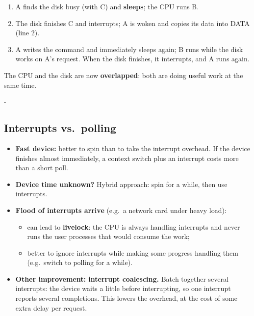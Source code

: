 \documentclass[11pt,a4paper]{article}
\makeatletter
\newcommand{\keepspace}[1]{\par\penalty-100\begingroup
  \setlength{\dimen@}{#1}\dimen@ii\pagegoal\advance\dimen@ii-\pagetotal
  \ifdim\dimen@>\dimen@ii\ifdim\dimen@ii>\z@\vfil\fi\break\fi\endgroup}
\makeatother
\begin{document}
\begin{enumerate}[label=\textbf{\arabic*.}]
  \item A finds the disk busy (with C) and \textbf{sleeps}; the CPU runs B.
  \item The disk finishes C and interrupts; A is woken and copies its data
        into DATA (line 2).
  \item[\textbf{3,4.}] A writes the command and immediately sleeps again; B runs
        while the disk works on A's request. When the disk finishes, it
        interrupts, and A runs again.
\end{enumerate}
The CPU and the disk are now \textbf{overlapped}: both are doing useful work
at the same time.

\keepspace{17\baselineskip}
\subsection{Interrupts vs.\ polling}

\begin{quizbox}
\begin{itemize}
  \item \textbf{Fast device:} better to spin than to take the interrupt
        overhead. If the device finishes almost immediately, a context switch
        plus an interrupt costs more than a short poll.
  \item \textbf{Device time unknown?} Hybrid approach: spin for a while,
        then use interrupts.
  \item \textbf{Flood of interrupts arrive} (e.g.\ a network card under heavy
        load):
    \begin{itemize}
      \item can lead to \textbf{livelock}: the CPU is always handling
            interrupts and never runs the user processes that would consume
            the work;
      \item better to ignore interrupts while making some progress handling
            them (e.g.\ switch to polling for a while).
    \end{itemize}
  \item \textbf{Other improvement: interrupt coalescing.} Batch together
        several interrupts: the device waits a little before interrupting,
        so one interrupt reports several completions. This lowers the
        overhead, at the cost of some extra delay per request.
\end{itemize}
\end{quizbox}
\end{document}
